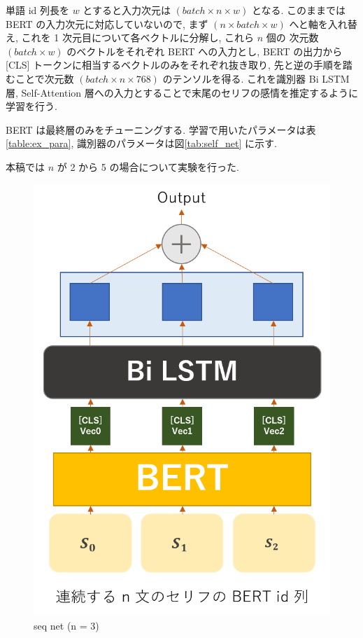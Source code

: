 \documentclass[twocolumn]{jarticle}     %
\begin{document}
単語 id 列長を $w$ とすると入力次元は $(batch \times n \times w)$ となる. このままでは BERT の入力次元に対応していないので, まず $(n \times batch \times w)$ へと軸を入れ替え, これを 1 次元目について各ベクトルに分解し, これら $n$ 個の 次元数 $(batch \times w)$ のベクトルをそれぞれ BERT への入力とし, BERT の出力から [CLS] トークンに相当するベクトルのみをそれぞれ抜き取り, 先と逆の手順を踏むことで次元数 $(batch \times n \times 768)$ のテンソルを得る. これを識別器 Bi LSTM 層, Self-Attention 層への入力とすることで末尾のセリフの感情を推定するように学習を行う.

BERT は最終層のみをチューニングする. 学習で用いたパラメータは表\ref{table:ex_para}, 識別器のパラメータは図\ref{tab:self_net} に示す.

本稿では $n$ が 2 から 5 の場合について実験を行った.

\begin{figure}[!htb]
  \begin{center}
    \includegraphics[scale=0.5]{seq_net.png}
    \caption{seq net (n = 3)} %
    \label{fig:net} %
  \end{center}
\end{figure}
\end{document}
